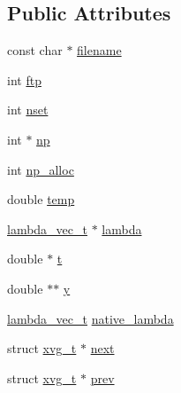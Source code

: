 \subsection*{\-Public \-Attributes}
\begin{DoxyCompactItemize}
\item 
const char $\ast$ \hyperlink{structxvg__t_a3e83a65d88dcec922958a043297405fe}{filename}
\item 
int \hyperlink{structxvg__t_a17323f8c028357e369978606581732f9}{ftp}
\item 
int \hyperlink{structxvg__t_af132b3021b420dfcebc60bdb502e3737}{nset}
\item 
int $\ast$ \hyperlink{structxvg__t_a0cbc9726322f54abc9cea297acc43efa}{np}
\item 
int \hyperlink{structxvg__t_a6ee40990ccea9dc7370a1c09224ea30a}{np\-\_\-alloc}
\item 
double \hyperlink{structxvg__t_aec77804712e4d36bb8ee445b62ef3d0c}{temp}
\item 
\hyperlink{structlambda__vec__t}{lambda\-\_\-vec\-\_\-t} $\ast$ \hyperlink{structxvg__t_ad0ce48c2b689cdd18144c5d011ef603a}{lambda}
\item 
double $\ast$ \hyperlink{structxvg__t_a2f078d656caf07ca696acdc45916701c}{t}
\item 
double $\ast$$\ast$ \hyperlink{structxvg__t_a309dc45889430b32beb7eb1e8f9882f6}{y}
\item 
\hyperlink{structlambda__vec__t}{lambda\-\_\-vec\-\_\-t} \hyperlink{structxvg__t_aa8ce14829f33fd3aa4a8742f2ba389bb}{native\-\_\-lambda}
\item 
struct \hyperlink{structxvg__t}{xvg\-\_\-t} $\ast$ \hyperlink{structxvg__t_ae020288e6105d4f9dfba2ed0f4f1aec7}{next}
\item 
struct \hyperlink{structxvg__t}{xvg\-\_\-t} $\ast$ \hyperlink{structxvg__t_a623a489131cbd2ccc564e41e02f38c8b}{prev}
\end{DoxyCompactItemize}


